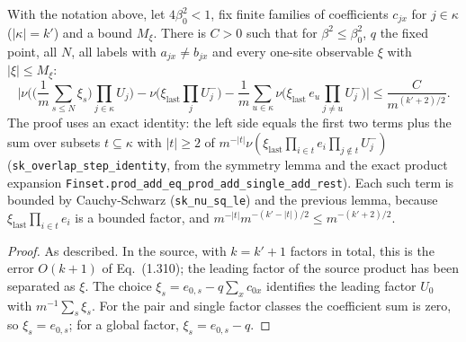 \begin{theorem}
\label{thm:sg-tal:last-site-step}
\leanok
{}
With the notation above, let $4\beta_0^2<1$, fix finite families of coefficients $c_{jx}$ for
$j\in\kappa$ ($|\kappa|=k'$) and a bound $M_\xi$. There is $C>0$ such that for
$\beta^2\le\beta_0^2$, $q$ the fixed point, all $N$, all labels with $a_{jx}\neq b_{jx}$ and
every one-site observable $\xi$ with $|\xi|\le M_\xi$:
\[
\Big|\nu\Big(\Big(\frac1m\sum_{s\le N}\xi_s\Big)\prod_{j\in\kappa}U_j\Big)
 -\nu\Big(\xi_{\mathrm{last}}\prod_jU_j^-\Big)
 -\frac1m\sum_{u\in\kappa}\nu\Big(\xi_{\mathrm{last}}\,e_u\prod_{j\ne u}U_j^-\Big)\Big|
 \le \frac{C}{m^{(k'+2)/2}} .
\]
The proof uses an exact identity: the left side equals the first two terms plus the sum over
subsets $t\subseteq\kappa$ with $|t|\ge2$ of
$m^{-|t|}\nu(\xi_{\mathrm{last}}\prod_{i\in t}e_i\prod_{j\notin t}U_j^-)$
(\texttt{sk\_overlap\_step\_identity}, from the symmetry lemma and the exact product expansion
\texttt{Finset.prod\_add\_eq\_prod\_add\_single\_add\_rest}). Each such term is bounded by
Cauchy-Schwarz (\texttt{sk\_nu\_sq\_le}) and the previous lemma, because
$\xi_{\mathrm{last}}\prod_{i\in t}e_i$ is a bounded factor, and $m^{-|t|}m^{-(k'-|t|)/2}\le m^{-(k'+2)/2}$.
\end{theorem}
\begin{proof}
\leanok
As described. In the source, with $k=k'+1$ factors in total, this is the error $O(k+1)$ of
Eq.~(1.310); the leading factor of the source product has been separated as $\xi$. The
choice $\xi_s=e_{0,s}-q\sum_x c_{0x}$ identifies the leading factor
$U_0$ with $m^{-1}\sum_s\xi_s$. For the pair and single factor classes the coefficient
sum is zero, so $\xi_s=e_{0,s}$; for a global factor, $\xi_s=e_{0,s}-q$.
\end{proof}

